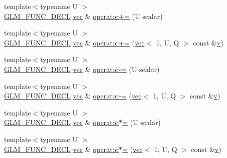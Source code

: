 \begin{DoxyCompactItemize}
\item 
{\footnotesize template$<$typename U $>$ }\\\mbox{\hyperlink{setup_8hpp_ab2d052de21a70539923e9bcbf6e83a51}{G\+L\+M\+\_\+\+F\+U\+N\+C\+\_\+\+D\+E\+CL}} \mbox{\hyperlink{structglm_1_1vec}{vec}} \& \mbox{\hyperlink{structglm_1_1vec_3_011_00_01_t_00_01_q_01_4_acdec3852ebe81329d4c52d4cf5a15a9e}{operator+=}} (U scalar)
\item 
{\footnotesize template$<$typename U $>$ }\\\mbox{\hyperlink{setup_8hpp_ab2d052de21a70539923e9bcbf6e83a51}{G\+L\+M\+\_\+\+F\+U\+N\+C\+\_\+\+D\+E\+CL}} \mbox{\hyperlink{structglm_1_1vec}{vec}} \& \mbox{\hyperlink{structglm_1_1vec_3_011_00_01_t_00_01_q_01_4_a658d20bd2f3896cd459c5569fbc086ae}{operator+=}} (\mbox{\hyperlink{structglm_1_1vec}{vec}}$<$ 1, U, Q $>$ const \&\mbox{\hyperlink{_s_d_l__opengl_8h_a10a82eabcb59d2fcd74acee063775f90}{v}})
\item 
{\footnotesize template$<$typename U $>$ }\\\mbox{\hyperlink{setup_8hpp_ab2d052de21a70539923e9bcbf6e83a51}{G\+L\+M\+\_\+\+F\+U\+N\+C\+\_\+\+D\+E\+CL}} \mbox{\hyperlink{structglm_1_1vec}{vec}} \& \mbox{\hyperlink{structglm_1_1vec_3_011_00_01_t_00_01_q_01_4_aa5f48c43d3c71aacd712fedcdf05362f}{operator-\/=}} (U scalar)
\item 
{\footnotesize template$<$typename U $>$ }\\\mbox{\hyperlink{setup_8hpp_ab2d052de21a70539923e9bcbf6e83a51}{G\+L\+M\+\_\+\+F\+U\+N\+C\+\_\+\+D\+E\+CL}} \mbox{\hyperlink{structglm_1_1vec}{vec}} \& \mbox{\hyperlink{structglm_1_1vec_3_011_00_01_t_00_01_q_01_4_afca22c18c34addd806151214edd57cc2}{operator-\/=}} (\mbox{\hyperlink{structglm_1_1vec}{vec}}$<$ 1, U, Q $>$ const \&\mbox{\hyperlink{_s_d_l__opengl_8h_a10a82eabcb59d2fcd74acee063775f90}{v}})
\item 
{\footnotesize template$<$typename U $>$ }\\\mbox{\hyperlink{setup_8hpp_ab2d052de21a70539923e9bcbf6e83a51}{G\+L\+M\+\_\+\+F\+U\+N\+C\+\_\+\+D\+E\+CL}} \mbox{\hyperlink{structglm_1_1vec}{vec}} \& \mbox{\hyperlink{structglm_1_1vec_3_011_00_01_t_00_01_q_01_4_ac3400fb8176cefe78c52da5a9188446c}{operator$\ast$=}} (U scalar)
\item 
{\footnotesize template$<$typename U $>$ }\\\mbox{\hyperlink{setup_8hpp_ab2d052de21a70539923e9bcbf6e83a51}{G\+L\+M\+\_\+\+F\+U\+N\+C\+\_\+\+D\+E\+CL}} \mbox{\hyperlink{structglm_1_1vec}{vec}} \& \mbox{\hyperlink{structglm_1_1vec_3_011_00_01_t_00_01_q_01_4_aa070c2898cf88a73e4f60581e77bce44}{operator$\ast$=}} (\mbox{\hyperlink{structglm_1_1vec}{vec}}$<$ 1, U, Q $>$ const \&\mbox{\hyperlink{_s_d_l__opengl_8h_a10a82eabcb59d2fcd74acee063775f90}{v}})

\end{DoxyCompactItemize}
